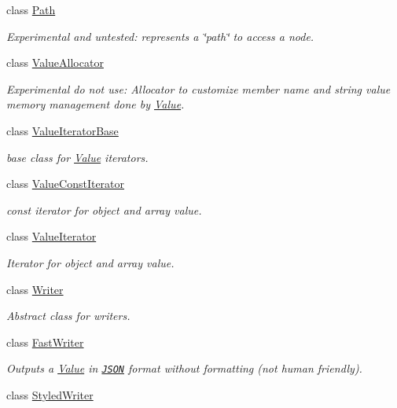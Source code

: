 \begin{DoxyCompactItemize}
class \hyperlink{classJson_1_1Path}{Path}
\begin{DoxyCompactList}\small\item\em Experimental and untested\-: represents a \char`\"{}path\char`\"{} to access a node. \end{DoxyCompactList}\item 
class \hyperlink{classJson_1_1ValueAllocator}{Value\-Allocator}
\begin{DoxyCompactList}\small\item\em Experimental do not use\-: Allocator to customize member name and string value memory management done by \hyperlink{classJson_1_1Value}{Value}. \end{DoxyCompactList}\item 
class \hyperlink{classJson_1_1ValueIteratorBase}{Value\-Iterator\-Base}
\begin{DoxyCompactList}\small\item\em base class for \hyperlink{classJson_1_1Value}{Value} iterators. \end{DoxyCompactList}\item 
class \hyperlink{classJson_1_1ValueConstIterator}{Value\-Const\-Iterator}
\begin{DoxyCompactList}\small\item\em const iterator for object and array value. \end{DoxyCompactList}\item 
class \hyperlink{classJson_1_1ValueIterator}{Value\-Iterator}
\begin{DoxyCompactList}\small\item\em Iterator for object and array value. \end{DoxyCompactList}\item 
class \hyperlink{classJson_1_1Writer}{Writer}
\begin{DoxyCompactList}\small\item\em Abstract class for writers. \end{DoxyCompactList}\item 
class \hyperlink{classJson_1_1FastWriter}{Fast\-Writer}
\begin{DoxyCompactList}\small\item\em Outputs a \hyperlink{classJson_1_1Value}{Value} in \href{http://www.json.org}{\tt J\-S\-O\-N} format without formatting (not human friendly). \end{DoxyCompactList}\item 
class \hyperlink{classJson_1_1StyledWriter}{Styled\-Writer}

\end{DoxyCompactItemize}
